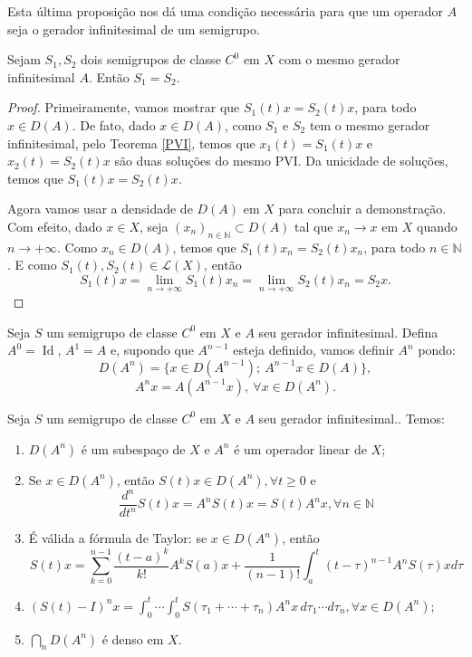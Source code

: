 \begin{remark}
    Esta última proposição nos dá uma condição necessária para que um operador $A$ seja o gerador infinitesimal de um semigrupo.
\end{remark}

\begin{proposition}[Unicidade]
Sejam $S_1,S_2$ dois semigrupos de classe $C^0$ em $X$ com o mesmo gerador infinitesimal $A$. Então $S_1=S_2$.
\end{proposition}
\begin{proof}
   Primeiramente, vamos mostrar que $S_1(t)x=S_2(t)x$, para todo $x\in D(A)$.
De fato, dado $x\in D(A)$, como $S_1$ e $S_2$ tem o mesmo gerador infinitesimal,  pelo Teorema \ref{PVI}, temos que $x_1(t)=S_1(t)x$ e $x_2(t)=S_2(t)x$ são duas soluções do mesmo PVI. Da unicidade de soluções, temos que $S_1(t)x=S_2(t)x$.

Agora vamos usar a densidade de $D(A)$ em $X$ para concluir a demonstração. Com efeito, dado $x\in X$, seja $(x_n)_{n\in \mathbb{N}}\subset D(A)$ tal que $x_n\to x$ em $X$ quando $n\to +\infty$. Como   $x_n\in D(A)$, temos que $S_1(t)x_n=S_2(t)x_n$, para todo $n\in \mathbb{N}$. E como  $S_1(t),S_2(t)\in \mathcal{L}(X)$, então
\[S_1(t)x=\lim_{n\to +\infty}S_1(t)x_n=\lim_{n\to +\infty}S_2(t)x_n=S_2x.\]
\end{proof}

\begin{definition}
    Seja $S$ um semigrupo de classe $C^0$ em $X$ e $A$ seu gerador infinitesimal. Defina $A^0=\operatorname{Id}$, $A^1=A$ e, supondo que $A^{n-1}$ esteja definido, vamos definir $A^n$ pondo:
\[D(A^n)=\{x\in D(A^{n-1});\ A^{n-1}x\in D(A)\},\]
\[A^nx=A(A^{n-1}x), \ \forall x\in D(A^{n}).\]
\end{definition}

\begin{proposition}
Seja   $S$ um semigrupo de classe $C^0$ em $X$ e $A$ seu gerador infinitesimal.. Temos:

\begin{enumerate}[$(i)$]
 \item $D\left(A^n\right)$ é um subespaço de $X$ e $A^n$ é um operador linear de $X$;

 \item Se $x \in {D}\left(A^n\right)$, então $S(t) x \in {D}\left(A^n\right), \forall t \geq 0$ e
\begin{equation}\label{id-dern}
\frac{d^n}{d t^n} S(t) x=A^n S(t) x=S(t) A^n x, \forall n \in \mathbb{N}
\end{equation}
\item É válida a fórmula de Taylor: se $x \in {D}\left(A^n\right)$, então
\[
S(t) x=\sum_{k=0}^{n-1} \frac{(t-a)^k}{k!} A^k S(a) x+\frac{1}{(n-1)!} \int_a^t(t-\tau)^{n-1} A^n S(\tau) x d \tau
\]
\item  $(S(t)-I)^n x=\displaystyle\int_0^t \cdots \int_0^t S\left(\tau_1+\cdots+\tau_n\right) A^n x\, d \tau_1 \cdots d \tau_n, \forall x \in D\left(A^n\right)$;
\item $\displaystyle\bigcap_n {D}\left(A^n\right)$ é denso em $X$.
\end{enumerate}
\end{proposition}

